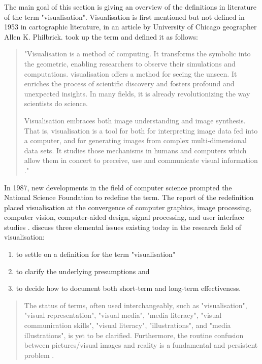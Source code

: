 The main goal of this section is giving an overview of the definitions in literature of the term "visualisation". Visualisation is first mentioned but not defined in 1953 in cartographic literature, in an article by University of Chicago geographer Allen K. Philbrick. \citeauthor{mccormick:1987} took up the term and defined it as follows:
\begin{quote}
 "Visualisation is a method of computing. It transforms the symbolic into the geometric, enabling researchers to observe their simulations and computations. visualisation offers a method for seeing the unseen. It enriches the process of scientific discovery and fosters profound and unexpected insights. In many fields, it is already revolutionizing the way scientists do science.

 Visualisation embraces both image understanding and image synthesis. That is, visualisation is a tool for both for interpreting image data fed into a computer, and for generating images from complex multi-dimensional data sets. It studies those mechanisms in humans and computers which allow them in concert to preceive, use and communicate visual information ."
\end{quote}

In 1987, new developments in the field of computer science prompted the National Science Foundation to redefine the term. The report of the redefinition placed visualisation at the convergence of computer graphics, image processing, computer vision, computer-aided design, signal processing, and user interface studies . \citeauthor{Phillips2010} discuss three elemental issues existing today in the research field of visualisation:

\begin{enumerate}
\item to settle on a definition for the term "visualisation"
\item to clarify the underlying presumptions and
\item to decide how to document both short-term and long-term effectiveness.
\end{enumerate}

\begin{quote}
The status of terms, often used interchangeably, such as "visualisation", "visual representation", "visual media", "media literacy", "visual communication skills", "visual literacy", "illustrations", and "media illustrations", is yet to be clarified. Furthermore, the routine confusion between pictures/visual images and reality is a fundamental and persistent problem .
\end{quote}


